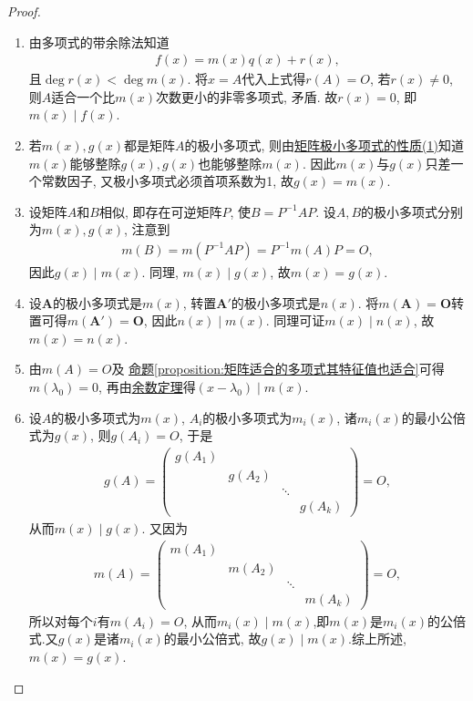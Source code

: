 \documentclass[../../main.tex]{subfiles}
\begin{document}
\begin{proof}
\begin{enumerate}[(1)]
\item 由多项式的带余除法知道
\begin{align*}
f(x) = m(x)q(x) + r(x),
\end{align*}
且$\deg r(x) < \deg m(x)$. 将$x = A$代入上式得$r(A) = O$, 若$r(x) \neq 0$, 则$A$适合一个比$m(x)$次数更小的非零多项式, 矛盾. 故$r(x) = 0$, 即$m(x) \mid f(x)$.

\item 若$m(x), g(x)$都是矩阵$A$的极小多项式, 则由\hyperref[proposition:极小多项式的性质]{矩阵极小多项式的性质(1)}知道$m(x)$能够整除$g(x), g(x)$也能够整除$m(x)$. 因此$m(x)$与$g(x)$只差一个常数因子, 又极小多项式必须首项系数为1, 故$g(x) = m(x)$.

\item 设矩阵$A$和$B$相似, 即存在可逆矩阵$P$, 使$B = P^{-1}AP$. 设$A, B$的极小多项式分别为$m(x), g(x)$, 注意到
\begin{align*}
m(B) = m(P^{-1}AP) = P^{-1}m(A)P = O,
\end{align*}
因此$g(x) \mid m(x)$. 同理, $m(x) \mid g(x)$, 故$m(x) = g(x)$.

\item 设\(\boldsymbol{A}\)的极小多项式是\(m(x)\), 转置\(\boldsymbol{A}'\)的极小多项式是\(n(x)\). 将\(m(\boldsymbol{A}) = \boldsymbol{O}\)转置可得\(m(\boldsymbol{A}') = \boldsymbol{O}\), 因此\(n(x)\mid m(x)\). 同理可证\(m(x)\mid n(x)\), 故\(m(x) = n(x)\).

\item 由$m(A) = O$及
\hyperref[proposition:矩阵适合的多项式其特征值也适合]{命题\ref{proposition:矩阵适合的多项式其特征值也适合}}可得$m(\lambda_0) = 0$, 再由\hyperref[theorem:余数定理]{余数定理}得$(x - \lambda_0) \mid m(x)$.

\item 设$A$的极小多项式为$m(x)$, $A_i$的极小多项式为$m_i(x)$, 诸$m_i(x)$的最小公倍式为$g(x)$, 则$g(A_i) = O$, 于是
\begin{align*}
g(A) = \begin{pmatrix}
g(A_1) & & \\
& g(A_2) & \\
& & \ddots & \\
& & & g(A_k)
\end{pmatrix} = O,
\end{align*}
从而$m(x) \mid g(x)$. 又因为
\begin{align*}
m(A) = \begin{pmatrix}
m(A_1) & & \\
& m(A_2) & \\
& & \ddots & \\
& & & m(A_k)
\end{pmatrix} = O,
\end{align*}
所以对每个$i$有$m(A_i) = O$, 从而$m_i(x) \mid m(x)$,即$m(x)$是$m_i(x)$的公倍式.又$g(x)$是诸$m_i(x)$的最小公倍式, 故$g(x) \mid m(x)$.综上所述,$m(x) = g(x)$.
\end{enumerate}
\end{proof}
\end{document}
